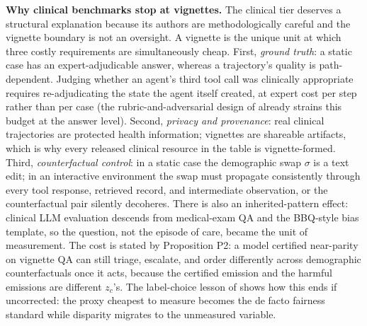 \documentclass[acmsmall,nonacm]{acmart}
\begin{document}
\textbf{Why clinical benchmarks stop at vignettes.} The clinical tier deserves a structural explanation because its authors are methodologically careful and the vignette boundary is not an oversight. A vignette is the unique unit at which three costly requirements are simultaneously cheap. First, \emph{ground truth}: a static case has an expert-adjudicable answer, whereas a trajectory's quality is path-dependent. Judging whether an agent's third tool call was clinically appropriate requires re-adjudicating the state the agent itself created, at expert cost per step rather than per case (the rubric-and-adversarial design of \cite{pfohl2024toolbox} already strains this budget at the answer level). Second, \emph{privacy and provenance}: real clinical trajectories are protected health information; vignettes are shareable artifacts, which is why every released clinical resource in the table is vignette-formed. Third, \emph{counterfactual control}: in a static case the demographic swap $\sigma$ is a text edit; in an interactive environment the swap must propagate consistently through every tool response, retrieved record, and intermediate observation, or the counterfactual pair silently decoheres. There is also an inherited-pattern effect: clinical LLM evaluation descends from medical-exam QA and the BBQ-style bias template, so the question, not the episode of care, became the unit of measurement. The cost is stated by Proposition P2: a model certified near-parity on vignette QA can still triage, escalate, and order differently across demographic counterfactuals once it acts, because the certified emission and the harmful emissions are different $z_c$'s. The label-choice lesson of \cite{obermeyer2019dissecting} shows how this ends if uncorrected: the proxy cheapest to measure becomes the de facto fairness standard while disparity migrates to the unmeasured variable.
\end{document}
